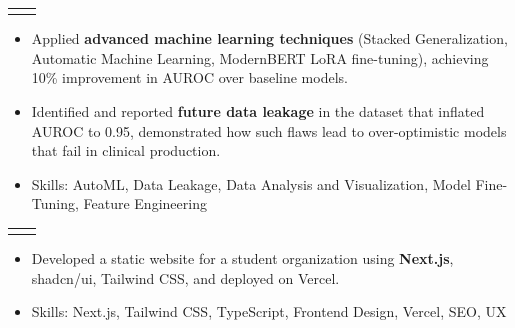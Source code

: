 \documentclass[a4paper,10pt]{article}
\makeatletter
\newcommand{\icononlylink}[2]{
  \href{#2}{#1}
}
\newcommand{\resumeItem}[1]{
  \item\small{#1}
}
\newcommand{\resumeProjectHeading}[2]{
  \vspace{-2pt}\item
    \begin{tabular*}{0.97\textwidth}[t]{@{}l@{\extracolsep{\fill}}r@{}}
      \textlight{\small#1} & \textlight{\small#2} \\
    \end{tabular*}\vspace{-7pt}
}
\newcommand{\resumeItemListStart}{
  \begin{itemize}[
    leftmargin=0.2in,
    rightmargin=0.2in,
    itemindent=0pt,
    labelsep=0.1in,
    itemsep=1pt,
    parsep=0pt,
    topsep=3pt,
    label={\raisebox{2pt}{\tiny$\bullet$}}
  ]
}
\newcommand{\resumeItemListEnd}{\end{itemize}}
\makeatother
\begin{document}
    \resumeProjectHeading
      {\textbf{30-Day All-Cause Hospital Readmission Prediction with MIMIC-IV (Group Project)}}
      {Oct 2025 -- Dec 2025}
      \resumeItemListStart
        \resumeItem{Applied \textbf{advanced machine learning techniques} (Stacked Generalization, Automatic Machine Learning, ModernBERT LoRA fine-tuning), achieving 10\% improvement in AUROC over baseline models.}
        \resumeItem{Identified and reported \textbf{future data leakage} in the dataset that inflated AUROC to 0.95, demonstrated how such flaws lead to over-optimistic models that fail in clinical production.}
        \resumeItem{Skills: AutoML, Data Leakage, Data Analysis and Visualization, Model Fine-Tuning, Feature Engineering}
      \resumeItemListEnd

    \resumeProjectHeading
      {\textbf{alphahku.vercel.app}}%
      {July 2025 -- Aug 2025}
      \resumeItemListStart
        \resumeItem{Developed a static website for a student organization using \textbf{Next.js}, shadcn/ui, Tailwind CSS, and deployed on Vercel.}
        \resumeItem{Skills: Next.js, Tailwind CSS, TypeScript, Frontend Design, Vercel, SEO, UX}
    \resumeItemListEnd


\end{document}
